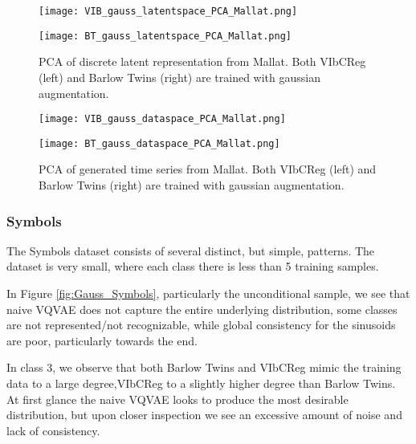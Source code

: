 \documentclass[../../thesis.tex]{subfiles}
\begin{document}
\begin{figure}[H]
    \centering
    \begin{minipage}[b]{0.40\textwidth}
        \centering
        \texttt{[image: VIB\_gauss\_latentspace\_PCA\_Mallat.png]}
    \end{minipage}
    \begin{minipage}[b]{0.40\textwidth}
        \centering
        \texttt{[image: BT\_gauss\_latentspace\_PCA\_Mallat.png]}
    \end{minipage}
    \caption{PCA of discrete latent representation from Mallat. Both VIbCReg (left) and Barlow Twins (right) are trained with gaussian augmentation.}
    \label{fig:Mallat_latent_PCA}
\end{figure}

\begin{figure}[H]
    \centering
    \begin{minipage}[b]{0.40\textwidth}
        \centering
        \texttt{[image: VIB\_gauss\_dataspace\_PCA\_Mallat.png]}
    \end{minipage}
    \begin{minipage}[b]{0.40\textwidth}
        \centering
        \texttt{[image: BT\_gauss\_dataspace\_PCA\_Mallat.png]}
    \end{minipage}
    \caption{PCA of generated time series from Mallat. Both VIbCReg (left) and Barlow Twins (right) are trained with gaussian augmentation.}
    \label{fig:Mallat_data_PCA}
\end{figure}




\subsubsection{Symbols}

The Symbols dataset consists of several distinct, but simple, patterns. The dataset is very small, where each class there is less than 5 training samples.\newline

In Figure \ref{fig:Gauss_Symbols}, particularly the unconditional sample, we see that naive VQVAE does not capture the entire underlying distribution, some classes are not represented/not recognizable, while global consistency for the sinusoids are poor, particularly towards the end.\newline

In class 3, we observe that both Barlow Twins and VIbCReg mimic the training data to a large degree,VIbCReg to a slightly higher degree than Barlow Twins. At first glance the naive VQVAE looks to produce the most desirable distribution, but upon closer inspection we see an excessive amount of noise and lack of consistency.\newline
\end{document}
